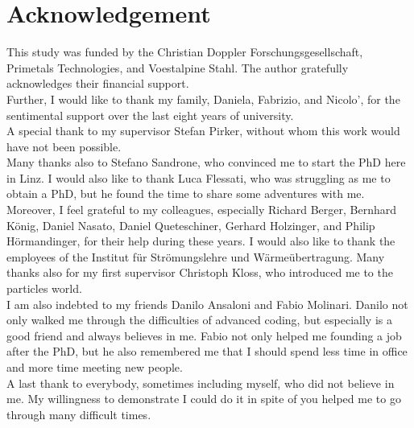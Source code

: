\chapter*{Acknowledgement}
\label{cap:acknowledgement}
This study was funded by the Christian Doppler Forschungsgesellschaft, Primetals
Technologies, and Voestalpine Stahl. 
The author gratefully acknowledges their financial support.\\
Further, I would like to thank my family, Daniela, Fabrizio, and Nicolo', for
the sentimental support over the last eight years of university.\\
A special thank to my supervisor Stefan Pirker, without whom this work would
have not been possible.\\
Many thanks also to Stefano Sandrone, who convinced me to start the PhD here in
Linz.
I would also like to thank Luca Flessati, who was struggling as me to
obtain a PhD, but he found the time to share some adventures with me.\\
Moreover, I feel grateful to my colleagues, especially Richard Berger, Bernhard
K\"{o}nig, Daniel Nasato, Daniel Queteschiner, Gerhard Holzinger, and Philip
H\"{o}rmandinger, for their help during these years.
I would also like to thank the employees of the Institut f\"{u}r Str\"{o}mungslehre und
W\"{a}rme\"{u}bertragung.
Many thanks also for my first supervisor Christoph Kloss, who introduced me to
the particles world.\\
I am also indebted to my friends Danilo Ansaloni and Fabio Molinari. 
Danilo not only walked me through the difficulties of advanced coding, but
especially is a good friend and always believes in me. 
Fabio not only helped me founding a job after the PhD, but he also remembered me
that I should spend less time in office and more time meeting new people.\\
A last thank to everybody, sometimes including myself, who did not believe in
me. My willingness to demonstrate I could do it in spite of you helped me to go
through many difficult times.
